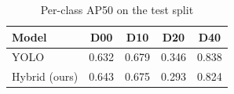 \begin{table}[t]\centering\caption{Per-class AP50 on the test split}\label{tab:perclass}
\begin{tabular}{lcccc}\toprule Model & D00 & D10 & D20 & D40 \\ \midrule
YOLO & 0.632 & 0.679 & 0.346 & 0.838 \\
Hybrid (ours) & 0.643 & 0.675 & 0.293 & 0.824 \\
\bottomrule\end{tabular}\end{table}
